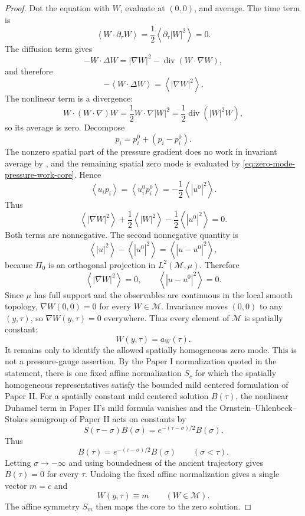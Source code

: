 \documentclass[11pt]{amsart}
\numberwithin{equation}{section}
\theoremstyle{plain}
\theoremstyle{definition}
\theoremstyle{remark}
\newcommand{\divergence}{\operatorname{div}}
\newcommand{\calM}{\mathcal M}
\begin{document}
\begin{proof}
Dot the equation with \(W\), evaluate at \((0,0)\), and average.  The time
term is
\[
   \left\langle W\cdot\partial_\tau W\right\rangle
   =\frac12\left\langle\partial_\tau |W|^2\right\rangle=0 .
\]
The diffusion term gives
\[
   -W\cdot\Delta W
   =
   |\nabla W|^2-\divergence(W\cdot\nabla W),
\]
and therefore
\[
   -\left\langle W\cdot\Delta W\right\rangle
   =
   \left\langle|\nabla W|^2\right\rangle .
\]
The nonlinear term is a divergence:
\[
   W\cdot(W\cdot\nabla)W
   =
   \frac12W\cdot\nabla |W|^2
   =
   \frac12\divergence(|W|^2W),
\]
so its average is zero.  Decompose
\[
   p_i=p_i^0+(p_i-p_i^0).
\]
The nonzero spatial part of the pressure gradient does no work in invariant
average by , and the remaining
spatial zero mode is evaluated by
\eqref{eq:zero-mode-pressure-work-core}.  Hence
\[
   \left\langle u_ip_i\right\rangle
   =
   \left\langle u_i^0p_i^0\right\rangle
   =
   -\frac12\left\langle|u^0|^2\right\rangle .
\]
Thus
\begin{equation}\label{eq:mean-energy-core}
   \left\langle|\nabla W|^2\right\rangle
   +\frac12\left\langle|W|^2\right\rangle
   -\frac12\left\langle|u^0|^2\right\rangle=0.
\end{equation}
Both terms are nonnegative.  The second nonnegative quantity is
\[
   \left\langle|u|^2\right\rangle-\left\langle|u^0|^2\right\rangle
   =
   \left\langle|u-u^0|^2\right\rangle,
\]
because \(\Pi_0\) is an orthogonal projection in \(L^2(\calM,\mu)\).
Therefore
\[
   \left\langle|\nabla W|^2\right\rangle=0,
   \qquad
   \left\langle|u-u^0|^2\right\rangle=0 .
\]
Since \(\mu\) has full support and the observables are continuous in the local
smooth topology, \(\nabla W(0,0)=0\) for every \(W\in\calM\).  Invariance
moves \((0,0)\) to any \((y,\tau)\), so \(\nabla W(y,\tau)=0\) everywhere.
Thus every element of \(\calM\) is spatially constant:
\[
   W(y,\tau)=a_W(\tau).
\]
It remains only to identify the allowed spatially homogeneous zero mode.  This
is not a pressure-gauge assertion.  By the Paper I normalization quoted in the
statement, there is one fixed affine normalization \(S_c\) for which the
spatially homogeneous representatives satisfy the bounded mild centered
formulation of Paper II.  For a spatially constant mild centered solution
\(B(\tau)\), the nonlinear Duhamel term in Paper II's mild formula vanishes
and the Ornstein--Uhlenbeck--Stokes semigroup of Paper II acts on constants by
\[
   S(\tau-\sigma)B(\sigma)=e^{-(\tau-\sigma)/2}B(\sigma).
\]
Thus
\[
   B(\tau)=e^{-(\tau-\sigma)/2}B(\sigma)
   \qquad(\sigma<\tau).
\]
Letting \(\sigma\to-\infty\) and using boundedness of the ancient trajectory
gives \(B(\tau)=0\) for every \(\tau\).  Undoing the fixed affine
normalization gives a single vector \(m=c\) and
\[
   W(y,\tau)\equiv m
   \qquad(W\in\calM).
\]
The affine symmetry \(S_m\) then maps the core to the zero solution.
\end{proof}
\end{document}
